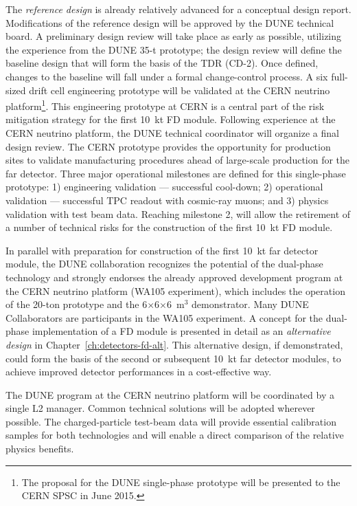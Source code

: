 The \textit{reference design} is already relatively advanced for a
conceptual design report. Modifications of the reference design will
be approved by the DUNE technical board. A preliminary design
review will take place as early as possible, utilizing the experience
from the DUNE 35-t prototype; the design review will define the
baseline design that will form the basis of the TDR (CD-2).  Once
defined, changes to the baseline will fall under a formal
change-control process. A six full-sized drift cell
engineering prototype will be validated at the CERN neutrino
platform\footnote{The proposal for the DUNE single-phase prototype
  will be presented to the CERN SPSC in June 2015.}.  This engineering
prototype at CERN is a central part of the risk mitigation strategy
for the first 10~kt FD module. Following experience at the CERN
neutrino platform, the DUNE technical coordinator will organize a
final design review. The CERN prototype provides the opportunity for
production sites to validate manufacturing procedures ahead of
large-scale production for the far detector. Three major operational
milestones are defined for this single-phase prototype: 1) engineering
validation --- successful cool-down; 2) operational validation ---
successful TPC readout with cosmic-ray muons; and 3) physics
validation with test beam data. Reaching milestone 2, will allow the
retirement of a number of technical risks for the construction of the
first 10~kt FD module.

In parallel with preparation for construction of the first 10~kt far
detector module, the DUNE collaboration recognizes the potential of
the dual-phase technology and strongly endorses the already approved
development program at the CERN neutrino platform (WA105 experiment),
which includes the operation of the 20-ton prototype and the
6$\times$6$\times$6~m$^3$ demonstrator. Many DUNE Collaborators are
participants in the WA105 experiment. A concept for the dual-phase
implementation of a FD module is presented in detail as an
\textit{alternative design} in Chapter~\ref{ch:detectors-fd-alt}. This
alternative design, if demonstrated, could form the basis of the
second or subsequent 10~kt far detector modules, to achieve improved
detector performances in a cost-effective way.

The DUNE program at the CERN neutrino platform will be coordinated by
a single L2 manager. Common technical solutions will be adopted
wherever possible.  The charged-particle test-beam data will provide
essential calibration samples for both technologies and will enable a
direct comparison of the relative physics benefits.

